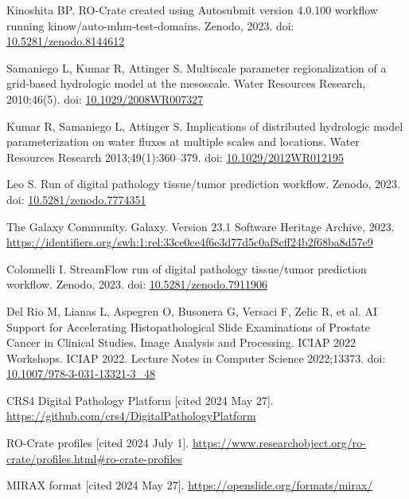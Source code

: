 \documentclass[10pt,letterpaper]{article}
\begin{document}
\begin{thebibliography}{10}
\begin{small}
Kinoshita BP.
RO-Crate created using Autosubmit version 4.0.100 workflow running kinow/auto-mhm-test-domains.
Zenodo, 2023.
doi: \href{https://doi.org/10.5281/zenodo.8144612}{10.5281/zenodo.8144612}

Samaniego L, Kumar R, Attinger S.
Multiscale parameter regionalization of a grid-based hydrologic model at the mesoscale.
Water Resources Research, 2010;46(5).
doi: \href{https://doi.org/10.1029/2008WR007327}{10.1029/2008WR007327}

Kumar R, Samaniego L, Attinger S.
Implications of distributed hydrologic model parameterization on water fluxes at multiple scales and locations.
Water Resources Research 2013;49(1):360--379.
doi: \href{https://doi.org/10.1029/2012WR012195}{10.1029/2012WR012195}

Leo S.
Run of digital pathology tissue/tumor prediction workflow.
Zenodo, 2023.
doi: \href{https://doi.org/10.5281/zenodo.7774351}{10.5281/zenodo.7774351}

The Galaxy Community.
Galaxy. Version 23.1
Software Heritage Archive, 2023.
\url{https://identifiers.org/swh:1:rel:33ce0ce4f6e3d77d5c0af8cff24b2f68ba8d57e9}

Colonnelli I.
StreamFlow run of digital pathology tissue/tumor prediction workflow.
Zenodo, 2023.
doi: \href{https://doi.org/10.5281/zenodo.7911906}{10.5281/zenodo.7911906}

Del Rio M, Lianas L, Aspegren O, Busonera G, Versaci F, Zelic R, et al.
AI Support for Accelerating Histopathological Slide Examinations of Prostate Cancer in Clinical Studies.
Image Analysis and Processing. ICIAP 2022 Workshops. ICIAP 2022. Lecture Notes in Computer Science 2022;13373.
doi: \href{https://doi.org/10.1007/978-3-031-13321-3_48}{10.1007/978-3-031-13321-3\_48}

CRS4 Digital Pathology Platform [cited 2024 May 27].
\url{https://github.com/crs4/DigitalPathologyPlatform}

RO-Crate profiles [cited 2024 July 1].
\url{https://www.researchobject.org/ro-crate/profiles.html\#ro-crate-profiles}

MIRAX format [cited 2024 May 27].
\url{https://openslide.org/formats/mirax/}


\end{small}
\end{thebibliography}
\end{document}

